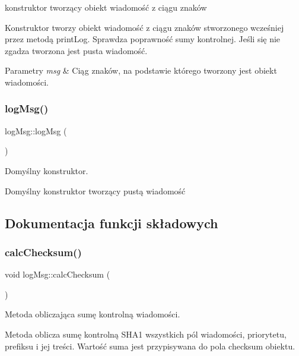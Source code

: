 konstruktor tworzący obiekt wiadomość z ciągu znaków 

Konstruktor tworzy obiekt wiadomość z ciągu znaków stworzonego wcześniej przez metodą print\+Log. Sprawdza poprawność sumy kontrolnej. Jeśli się nie zgadza tworzona jest pusta wiadomość. 
\begin{DoxyParams}{Parametry}
{\em msg} & Ciąg znaków, na podstawie którego tworzony jest obiekt wiadomości. \\
\hline
\end{DoxyParams}
\mbox{\label{classlog_msg_a7a9c2ceecce658a2d89c17e54f50627e}} 
\subsubsection{\texorpdfstring{log\+Msg()}{logMsg()}\hspace{0.1cm}{\footnotesize\ttfamily [2/2]}}
{\footnotesize\ttfamily log\+Msg\+::log\+Msg (\begin{DoxyParamCaption}{ }\end{DoxyParamCaption})}



Domyślny konstruktor. 

Domyślny konstruktor tworzący pustą wiadomość 

\subsection{Dokumentacja funkcji składowych}
\mbox{\label{classlog_msg_a652a3f776718a2c5800267fa898f05e6}} 
\subsubsection{\texorpdfstring{calc\+Checksum()}{calcChecksum()}}
{\footnotesize\ttfamily void log\+Msg\+::calc\+Checksum (\begin{DoxyParamCaption}{ }\end{DoxyParamCaption})}



Metoda obliczająca sumę kontrolną wiadomości. 

Metoda oblicza sumę kontrolną S\+H\+A1 wszystkich pól wiadomości, priorytetu, prefiksu i jej treści. Wartość suma jest przypisywana do pola checksum obiektu. \mbox{\label{classlog_msg_a19a5752d1cc3fc6a20d8571f4cbfc422}} 
